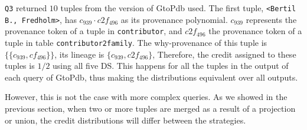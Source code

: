 \texttt{Q3} returned $10$ tuples from the version of GtoPdb used. 
The first tuple, \texttt{<Bertil B., Fredholm>}, has  $c_{939} \cdot c2f_{496}$ as its provenance polynomial.
$c_{939}$ represents the provenance token of a tuple in \texttt{contributor}, and $c2f_{496}$ the provenance token of a tuple in table \texttt{contributor2family}. 
The why-provenance of this tuple is $\{\{c_{939}, cf_{496} \}\}$, its lineage is $\{c_{939}, c2f_{496} \}$, 
Therefore, the credit assigned to these tuples is $1/2$ using all five DS.
This happens for all the tuples in the output of each query of GtoPdb, thus making the distributions equivalent over all outputs.

However, this is not the case with more complex queries. As we showed in the previous section, when two or more tuples are merged as a result of a projection or union, the credit distributions will differ between the strategies. %

